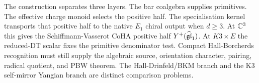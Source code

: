 The construction separates three layers. The bar coalgebra supplies
primitives. The effective charge monoid selects the positive half. The
specialisation kernel transports that positive half to the native
$E_1$ chiral output when $d\geq3$. At $\mathbb{C}^3$ this gives the
Schiffmann-Vasserot CoHA positive half
$Y^{+}(\widehat{\mathfrak{gl}}_1)$. At $K3\times E$ the reduced-DT scalar
fixes the primitive denominator test. Compact Hall-Borcherds recognition
must still supply the algebraic source, orientation character, pairing,
radical quotient, and PBW theorem. The Hall-Drinfeld/BKM branch and the
K3 self-mirror Yangian branch are distinct comparison problems.
